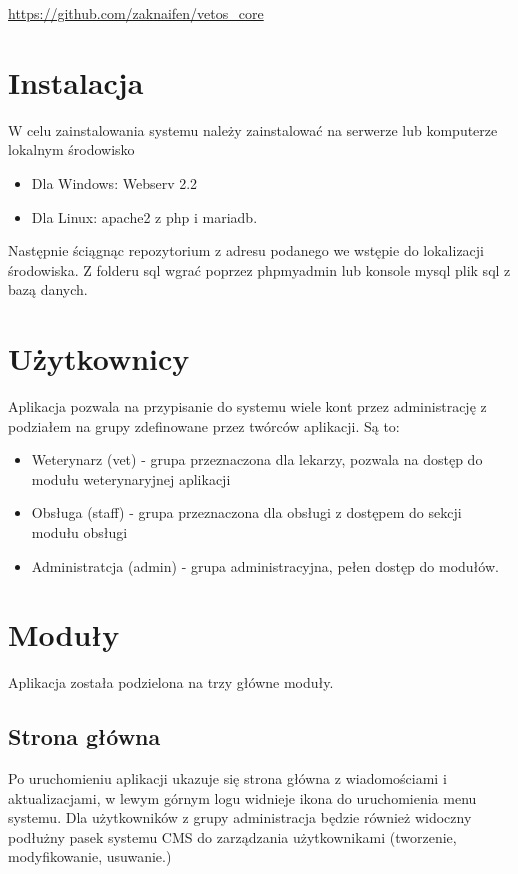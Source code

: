\documentclass[10pt,a4paper]{article}
\begin{document}
	\url{https://github.com/zaknaifen/vetos_core}
	
	\section {Instalacja}
		W celu zainstalowania systemu należy zainstalować na serwerze lub komputerze lokalnym środowisko
		\begin{itemize}
			\item Dla Windows: Webserv 2.2
			\item Dla Linux: apache2 z php i mariadb.
		\end{itemize}
	Następnie ściągnąc repozytorium z adresu podanego we wstępie do lokalizacji środowiska. Z folderu sql wgrać poprzez phpmyadmin lub konsole mysql plik sql z bazą danych. 
	
	
	
	
	
	\section {Użytkownicy}
		Aplikacja pozwala na przypisanie do systemu wiele kont przez administrację z podziałem na grupy zdefinowane przez twórców aplikacji. Są to:
		\begin{itemize}
			\item Weterynarz (vet) - grupa przeznaczona dla lekarzy, pozwala na dostęp do modułu weterynaryjnej aplikacji
			\item Obsługa (staff) - grupa przeznaczona dla obsługi z dostępem do sekcji modułu obsługi
			\item Administratcja (admin) - grupa administracyjna, pełen dostęp do modułów. 
		\end{itemize}
	
	\section{Moduły}
	Aplikacja została podzielona na trzy główne moduły. 
	\subsection{Strona główna}
	Po uruchomieniu aplikacji ukazuje się strona główna z wiadomościami i aktualizacjami, w lewym górnym logu widnieje ikona do uruchomienia menu systemu. Dla użytkowników z grupy administracja będzie również widoczny podłużny pasek systemu CMS do zarządzania użytkownikami (tworzenie, modyfikowanie, usuwanie.)
	
\end{document}
